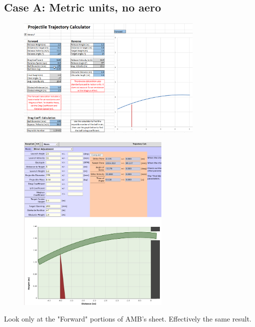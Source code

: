 \documentclass[10pt,letterpaper]{article}
\begin{document}
	\newpage
	\subsection*{Case A: Metric units, no aero}

	\begin{figure}[H]
		\includegraphics[width=0.8\textwidth]{validation/trajectory_AMB_A.png}
	\end{figure}

	\begin{figure}[H]
		\includegraphics[width=0.65\textwidth]{validation/trajectory_EC_A.png}
	\end{figure}

	Look only at the "Forward" portions of AMB's sheet. Effectively the same result.

	\newpage
\end{document}
